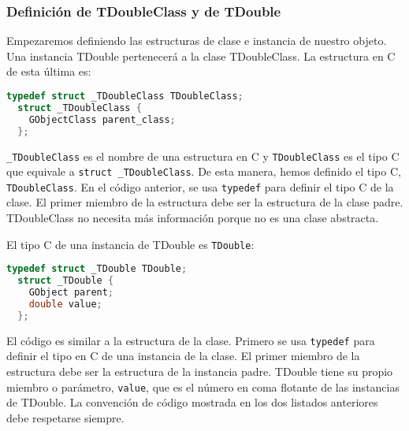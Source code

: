 \subsubsection{Definición de \textsf{TDoubleClass} y de \textsf{TDouble}}
Empezaremos definiendo las estructuras de clase e instancia de nuestro objeto.
Una instancia \textsf{TDouble} pertenecerá a la clase \textsf{TDoubleClass}. La estructura en C de esta última es:
\begin{lstlisting}[language=C]
  typedef struct _TDoubleClass TDoubleClass;
  struct _TDoubleClass {
    GObjectClass parent_class;
  };
\end{lstlisting}

\texttt{\_TDoubleClass} es el nombre de una estructura en C y \texttt{TDoubleClass} es el tipo C que equivale
a \texttt{struct \_TDoubleClass}. De esta manera, hemos definido el tipo C, \texttt{TDoubleClass}.
En el código anterior, se usa \texttt{typedef} para definir el tipo C de la clase. El primer miembro de la estructura
debe ser la estructura de la clase padre. \textsf{TDoubleClass} no necesita más información porque no es una
clase abstracta.

\newpage
El tipo C de una instancia de \textsf{TDouble} es \texttt{TDouble}:
\begin{lstlisting}[language=C]
  typedef struct _TDouble TDouble;
  struct _TDouble {
    GObject parent;
    double value;
  };
\end{lstlisting}
  
El código es similar a la estructura de la clase. Primero se usa \texttt{typedef} para definir el tipo en C de una
instancia de la clase. El primer miembro de la estructura debe ser la estructura de la instancia padre.
\textsf{TDouble} tiene su propio miembro o parámetro, \texttt{value}, que es el número en coma flotante
de las instancias de \textsf{TDouble}.
La convención de código mostrada en los dos listados anteriores debe respetarse siempre.





